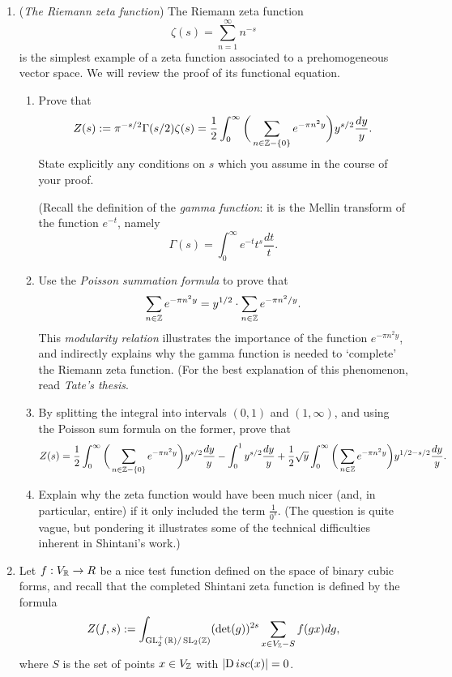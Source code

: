 \documentclass[12pt,amsfont]{amsart}
\begin{document}
\begin{enumerate}
\item ({\it The Riemann zeta function}) The Riemann zeta function
\[
\zeta(s) = \sum_{n = 1}^{\infty} n^{-s}
\]
is the simplest example of a zeta function associated to a prehomogeneous vector space. We will review
the proof of its functional equation.
\begin{enumerate}
\item
Prove that
\[
Z(s) := \pi^{-s/2} \Gamma(s/2) \zeta(s) = \frac{1}{2}
\int_0^{\infty} \bigg( \sum_{n \in {\mathbb Z} - \{ 0 \} } e^{- \pi n^2 y} \bigg) y^{s/2} \frac{dy}{y}.
\]
State explicitly any conditions on $s$ which you assume in the course of your proof.

(Recall the definition of the {\itshape gamma function}: it is the Mellin transform of the function $e^{-t}$, namely
\[
\Gamma(s) = \int_0^{\infty} e^{-t} t^s \frac{dt}{t}.
\]
\item
Use the {\itshape Poisson summation formula} to prove that
\[
\sum_{n \in {\mathbb Z}} e^{- \pi n^2 y} = 
y^{1/2} \cdot \sum_{n \in {\mathbb Z}} e^{- \pi n^2/y}.
\]
This {\itshape modularity relation} illustrates the importance of the function $e^{- \pi n^2 y}$,
and indirectly explains why the gamma function is needed to `complete' the Riemann zeta
function. (For the best explanation of this phenomenon, read {\itshape Tate's thesis}.
\item
By splitting the integral into intervals $(0, 1)$ and $(1, \infty)$, and using the Poisson sum formula on the
former, prove that
\[
Z(s) = 
\frac{1}{2} \int_0^{\infty} \bigg( \sum_{n \in {\mathbb Z} - \{ 0 \} } e^{- \pi n^2 y} \bigg) y^{s/2} \frac{dy}{y}
- \int_0^1 y^{s/2} \frac{dy}{y}
+
\frac{1}{2} \sqrt{y} \int_0^{\infty} \bigg( \sum_{n \in {\mathbb Z} } e^{- \pi n^2 y} \bigg) y^{1/2 - s/2} \frac{dy}{y}.
\]
\item
Explain why the zeta function would have been much nicer (and, in particular, entire) if
it only included the term $\frac{1}{0^s}$. (The question is quite vague, but pondering it illustrates
some of the technical difficulties inherent in Shintani's work.)
\end{enumerate}
\item
Let $f : V_{{\mathbb R}} \rightarrow R$ be a nice test function defined on the space of binary cubic forms,
and recall that the completed Shintani zeta function is defined by the formula
\[
Z(f, s) := \int_{\operatorname{GL}_2^+({\mathbb R}) / \operatorname{SL}_2({\mathbb Z})} (\det(g))^{2s} \sum_{x \in V_{{\mathbb Z}} - S} f(gx) dg,
\]
where $S$ is the set of points $x \in V_{{\mathbb Z}}$ with $|{ {\operatorname Disc}}(x)| = 0$.
\begin{enumerate}

\end{enumerate}
\end{enumerate}
\end{document}
